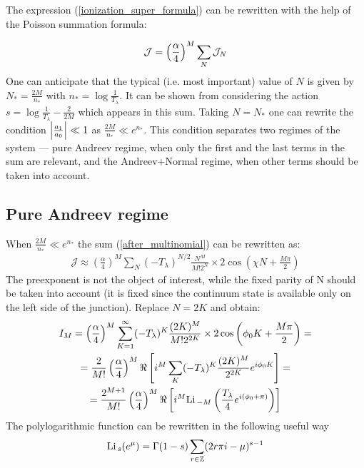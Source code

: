 The expression (\ref{ionization_super_formula}) can be rewritten with the help of the Poisson summation formula:

\begin{gather}
	\mathcal{J}
	=
	\left(\frac{\alpha}{4}\right)^M
	\sum_N
	\mathcal{J}_{N}	
\end{gather}
One can anticipate that the typical (i.e. most important) value of $ N $ is given by $ N_{*}=\frac{2M}{n_{*}} $ with $ n_{*}=\log\frac{1}{T_{\lambda}} $. It can be shown from considering the action $ s=\log\frac{1}{T_\lambda}-\frac{2}{2M} $ which appears in this sum. Taking $ N=N_{*} $ one can rewrite the condition $ \left|\frac{a_{1}}{a_{0}}\right|\ll1 $ as $ \frac{2M}{n_{*}}\ll e^{n_{*}} $. This condition separates two regimes of the system --- pure Andreev regime, when only the first and the last terms in the sum are relevant, and the Andreev+Normal regime, when other terms should be taken into account.

\subsection{Pure Andreev regime}

When $ \frac{2M}{n_{*}}\ll e^{n_{*}} $ the sum (\ref{after_multinomial}) can be rewritten as:
\begin{gather}
	\mathcal{J}\approx\left(\frac{\alpha}{4}\right)^{M}\sum_{N}(-T_{\lambda})^{N/2}\frac{N^{M}}{M!2^{N}}\times2\cos\left(\chi N+\frac{M\pi}{2}\right)
\end{gather}
The preexponent is not the object of interest, while the fixed parity of N should be taken into account (it is fixed since the continuum state is available only on the left side of the junction). Replace $ N=2K $ and obtain:
\begin{multline}
	I_{M}=\left(\frac{\alpha}{4}\right)^{M}\sum_{K=1}^{\infty}(-T_{\lambda})^{K}\frac{(2K)^{M}}{M!2^{2K}}\times2\cos\left(\phi_{0}K+\frac{M\pi}{2}\right)=
	\\
	=\frac{2}{M!}\left(\frac{\alpha}{4}\right)^{M}\Re\left[i^{M}\sum_{K}(-T_{\lambda})^{K}\frac{(2K)^{M}}{2^{2K}}e^{i\phi_{0}K}\right]=\\=\frac{2^{M+1}}{M!}\left(\frac{\alpha}{4}\right)^{M}\Re\left[i^{M}\mathrm{Li}\,_{-M}\left(\frac{T_{\lambda}}{4}e^{i(\phi_{0}+\pi)}\right)\right]
\end{multline}
The polylogarithmic function can be rewritten in the following useful way
\[
\mathrm{Li}\,_{s}(e^{\mu})=\Gamma(1-s)\sum_{r\in\mathbb{Z}}(2r\pi i-\mu)^{s-1}
\]

